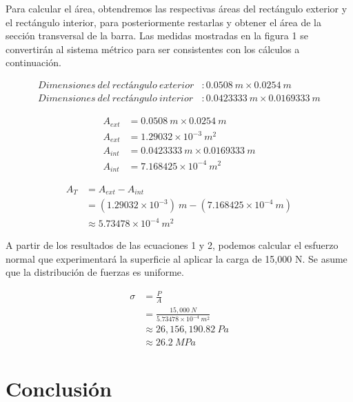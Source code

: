 \documentclass[12pt, letterpaper]{article}
\begin{document}
Para calcular el área, obtendremos las respectivas áreas del rectángulo exterior y el rectángulo interior, para posteriormente restarlas y obtener el área de la sección transversal de la barra. Las medidas mostradas en la figura 1 se convertirán al sistema métrico para ser consistentes con los cálculos a continuación.

\begin{equation*}
\begin{split}
	Dimensiones\ del\ rectángulo\ exterior&: 0.0508\ m \times 0.0254\ m\\
	Dimensiones\ del\ rectángulo\ interior&: 0.0423333\ m \times 0.0169333\ m
\end{split}
\end{equation*}

\begin{equation}
	\begin{split}
	A_{ext}	&= 0.0508\ m \times 0.0254\ m\\
	A_{ext} &= 1.29032 \times 10^{-3}\ m^2\\
	A_{int} &= 0.0423333\ m \times 0.0169333\ m\\
	A_{int} &= 7.168425 \times 10^{-4}\ m^2
	\end{split}
\end{equation}

\begin{equation}
	\begin{split}
	A_T &= A_{ext} - A_{int}\\
	&= (1.29032 \times 10^{-3})\ m - (7.168425 \times 10^{-4}\ m)\\
		&\approx5.73478 \times 10^{-4}\ m^2
	\end{split}
\end{equation}

A partir de los resultados de las ecuaciones 1 y 2, podemos calcular el esfuerzo normal que experimentará la superficie al aplicar la carga de 15,000 N. Se asume que la distribución de fuerzas es uniforme.

\begin{equation}
	\begin{split}
		\sigma &= \frac{P}{A}\\
		&= \frac{15,000\ N}{5.73478 \times 10^{-4}\ m^2}\\
		&\approx 26,156,190.82\ Pa\\
		&\boxed{\approx 26.2\ MPa}
	\end{split}
\end{equation}

\section*{Conclusión}
\end{document}
